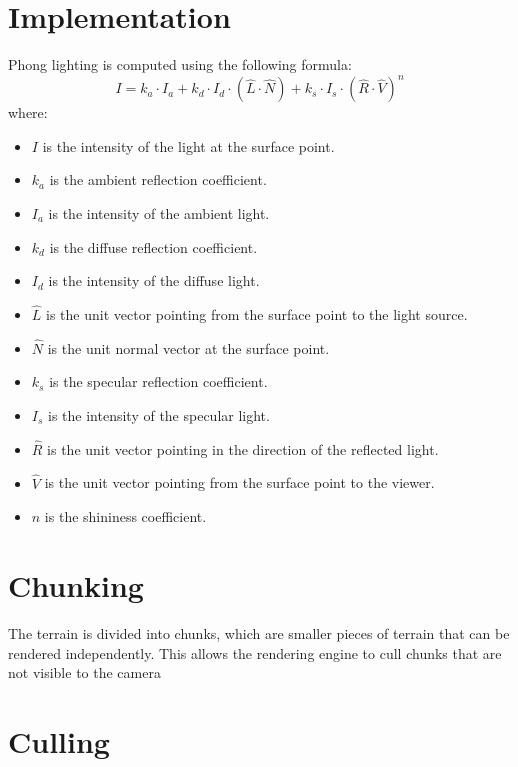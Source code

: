 \documentclass{report}
\begin{document}
\section{Implementation}
Phong lighting is computed using the following formula: $$ I = k_a \cdot I_a + k_d \cdot I_d \cdot
	(\hat{L} \cdot \hat{N}) + k_s \cdot I_s \cdot (\hat{R} \cdot \hat{V})^n $$ where:
\begin{itemize}
	\item $I$ is the intensity of the light at the surface point.
	\item $k_a$ is the ambient reflection coefficient.
	\item $I_a$ is the intensity of the ambient light.
	\item $k_d$ is the diffuse reflection coefficient.
	\item $I_d$ is the intensity of the diffuse light.
	\item $\hat{L}$ is the unit vector pointing from the surface point to the light source.
	\item $\hat{N}$ is the unit normal vector at the surface point.
	\item $k_s$ is the specular reflection coefficient.
	\item $I_s$ is the intensity of the specular light.
	\item $\hat{R}$ is the unit vector pointing in the direction of the reflected light.
	\item $\hat{V}$ is the unit vector pointing from the surface point to the viewer.
	\item $n$ is the shininess coefficient.
\end{itemize}

\section{Chunking}
The terrain is divided into chunks, which are smaller pieces of terrain that can be rendered
independently. This allows the rendering engine to cull chunks that are not visible to the camera

\section{Culling}
\end{document}
